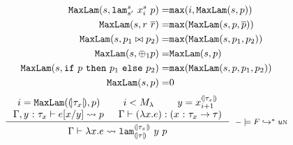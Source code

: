 \begin{align*}
\texttt{MaxLam}({s},{\texttt{lam}^{s}_{s'}\ {x^{s}_i}\ p}) =& \mathtt{max}(i, \texttt{MaxLam}({s},{p}))\\
\texttt{MaxLam}({s},{r\ \overline{r}}) =& \mathtt{max}(\texttt{MaxLam}({s},{p, \overline{p}})) \\
\texttt{MaxLam}({s},{p_1 \bowtie p_2}) = &  \mathtt{max}(\texttt{MaxLam}({s},{p_1, p_2}))\\
\texttt{MaxLam}({s},{\oplus_1 p}) =& \texttt{MaxLam}({s},{p})\\
\texttt{MaxLam}({s},{\mathtt{if}\ p\ \mathtt{then}\ p_1\ \mathtt{else}\ p_2}) =& \mathtt{max}(\texttt{MaxLam}({s},{p, p_1, p_2})) \\
\texttt{MaxLam}({s},{p}) =& 0 \\
\end{align*}
$$
\inference{
    i = \maxlam{\embed{\typ_x}}{\pred} & i < \maxlamarg & y = x^{\embed{\typ_x}}_{i+1} \\ 
    \tologicshort{\env, \tbind{y}{\typ_x}}{e\subst{x}{y}}{}{\pred}{}{}{} &
  	\hastype{\env}{(\efun{x}{}{e})}{(\tfun{x}{\typ_x}{\typ})}\\
}{
	\tologicshort{\env}{\efun{x}{}{e}}{}
	        {\smtlamname{\embed{\typ_x}}{\embed{\typ}}\ {y}\ {\pred}}
	        {}{}{}
}[\lgfun]
$$

